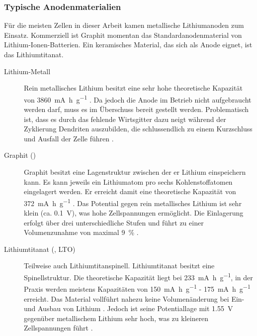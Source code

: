 \documentclass[a4paper, 11pt, headsepline,footsepline,twoside,abstract]{scrbook}
\begin{document}
\subsubsection{Typische Anodenmaterialien}
Für die meisten Zellen in dieser Arbeit kamen metallische Lithiumanoden zum Einsatz. Kommerziell ist Graphit momentan das Standardanodenmaterial von Lithium-Ionen-Batterien. Ein keramisches Material, das sich als Anode eignet, ist das Lithiumtitanat.
\begin{description}
\item[Lithium-Metall] Rein metallisches Lithium besitzt eine sehr hohe theoretische Kapazität von \SI{3860}{\milli\ampere\hour\per\gram} \cite{jossen_2006}. Da jedoch die Anode im Betrieb nicht aufgebraucht werden darf, muss es im Überschuss bereit gestellt werden. Problematisch ist, dass es durch das fehlende Wirtsgitter dazu neigt während der Zyklierung Dendriten auszubilden, die schlussendlich zu einem Kurzschluss und Ausfall der Zelle führen \cite{aurbach2002short}. 
\item[Graphit ()] Graphit besitzt eine Lagenstruktur zwischen der er Lithium einspeichern kann. Es kann jeweils ein Lithiumatom pro sechs Kohlenstoffatomen eingelagert werden. Er erreicht damit eine theoretische Kapazität von \SI{372}{\milli\ampere\hour\per\gram} \cite{delasCasas201274}. Das Potential gegen rein metallisches Lithium ist sehr klein (ca. \SI{0.1}{\volt}), was hohe Zellspannungen ermöglicht. Die Einlagerung erfolgt über drei unterschiedliche Stufen und führt zu einer Volumenzunahme von maximal \SI{9}{\percent} \cite{bub_skript}.
\item[Lithiumtitanat (, LTO)] Teilweise auch Lithiumtitanspinell. Lithiumtitanat besitzt eine Spinellstruktur. Die theoretische Kapazität liegt bei \SI{233}{\milli\ampere\hour\per\gram}, in der Praxis werden meistens Kapazitäten von \SI{150}{\milli\ampere\hour\per\gram} - \SI{175}{\milli\ampere\hour\per\gram} erreicht. Das Material vollführt nahezu keine Volumenänderung bei Ein- und Ausbau von Lithium \cite{huang2007effects}. Jedoch ist seine Potentiallage mit \SI{1.55}{\volt} gegenüber metallischem Lithium sehr hoch, was zu kleineren Zellspannungen führt \cite{hong2010effect}.
\end{description}
\end{document}
